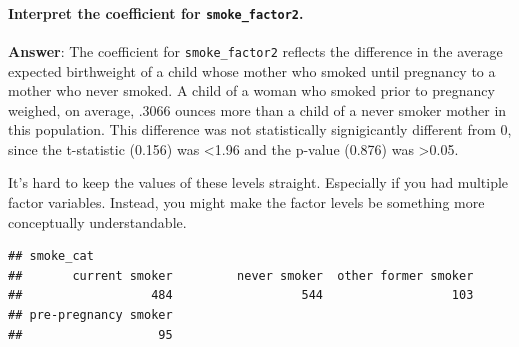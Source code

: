 \documentclass[]{article}
\newenvironment{Shaded}{\begin{snugshade}}{\end{snugshade}}
\newcommand{\DataTypeTok}[1]{\textcolor[rgb]{0.13,0.29,0.53}{#1}}
\newcommand{\DecValTok}[1]{\textcolor[rgb]{0.00,0.00,0.81}{#1}}
\newcommand{\KeywordTok}[1]{\textcolor[rgb]{0.13,0.29,0.53}{\textbf{#1}}}
\newcommand{\NormalTok}[1]{#1}
\newcommand{\OperatorTok}[1]{\textcolor[rgb]{0.81,0.36,0.00}{\textbf{#1}}}
\newcommand{\StringTok}[1]{\textcolor[rgb]{0.31,0.60,0.02}{#1}}
\let\oldparagraph\paragraph
\renewcommand{\paragraph}[1]{\oldparagraph{#1}\mbox{}}
\begin{document}
\hypertarget{interpret-the-coefficient-for-smoke_factor2.}{%
\paragraph{\texorpdfstring{Interpret the coefficient for
\texttt{smoke\_factor2}.}{Interpret the coefficient for smoke\_factor2.}}\label{interpret-the-coefficient-for-smoke_factor2.}}

\textbf{Answer}: The coefficient for \texttt{smoke\_factor2} reflects
the difference in the average expected birthweight of a child whose
mother who smoked until pregnancy to a mother who never smoked. A child
of a woman who smoked prior to pregnancy weighed, on average, .3066
ounces more than a child of a never smoker mother in this population.
This difference was not statistically signigicantly different from 0,
since the t-statistic (0.156) was \textless{}1.96 and the p-value
(0.876) was \textgreater{}0.05.

It's hard to keep the values of these levels straight. Especially if you
had multiple factor variables. Instead, you might make the factor levels
be something more conceptually understandable.

\begin{Shaded}
\end{Shaded}

\begin{verbatim}
## smoke_cat
##       current smoker         never smoker  other former smoker 
##                  484                  544                  103 
## pre-pregnancy smoker 
##                   95
\end{verbatim}
\end{document}
